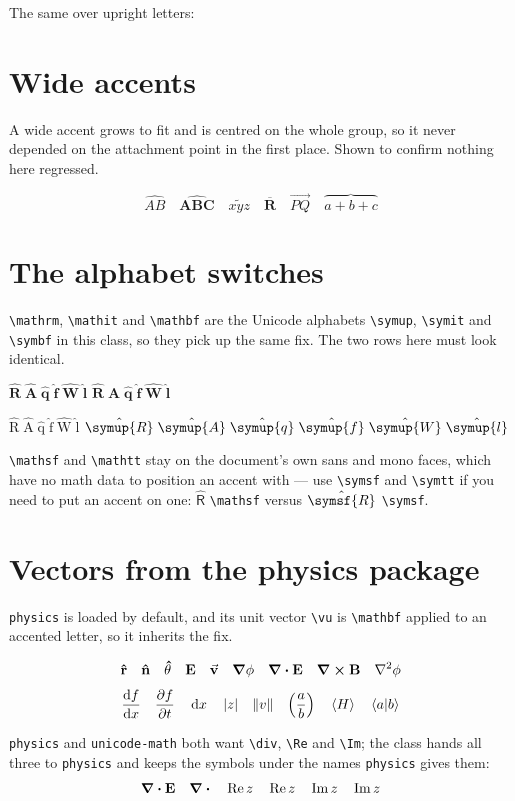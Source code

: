 \gwbaccrow{\symbf}

\medskip
\noindent
The same over upright letters:

\gwbaccrow{\symup}

\section{Wide accents}
\label{sec:wide}

A wide accent grows to fit and is centred on the whole group, so it never
depended on the attachment point in the first place. Shown to confirm nothing
here regressed.

\[
  \widehat{AB}\quad \widehat{\symbf{ABC}}\quad \widetilde{xyz}\quad
  \overline{\symbf{R}}\quad \overrightarrow{PQ}\quad
  \overbrace{a+b+c}
\]

\section{The alphabet switches}
\label{sec:alphabets}

\verb|\mathrm|, \verb|\mathit| and \verb|\mathbf| are the Unicode alphabets
\verb|\symup|, \verb|\symit| and \verb|\symbf| in this class, so they pick up
the same fix. The two rows here must look identical.

\medskip
\noindent
{}%
$\hat{\mathbf{R}}\;\hat{\mathbf{A}}\;\hat{\mathbf{q}}\;\hat{\mathbf{f}}\;
 \hat{\mathbf{W}}\;\hat{\mathbf{l}}$\qquad
{}%
$\hat{\symbf{R}}\;\hat{\symbf{A}}\;\hat{\symbf{q}}\;\hat{\symbf{f}}\;
 \hat{\symbf{W}}\;\hat{\symbf{l}}$

\medskip
\noindent
{}%
$\hat{\mathrm{R}}\;\hat{\mathrm{A}}\;\hat{\mathrm{q}}\;\hat{\mathrm{f}}\;
 \hat{\mathrm{W}}\;\hat{\mathrm{l}}$\qquad
{}%
$\hat{\symup{R}}\;\hat{\symup{A}}\;\hat{\symup{q}}\;\hat{\symup{f}}\;
 \hat{\symup{W}}\;\hat{\symup{l}}$

\medskip
\noindent
\verb|\mathsf| and \verb|\mathtt| stay on the document's own sans and mono
faces, which have no math data to position an accent with --- use
\verb|\symsf| and \verb|\symtt| if you need to put an accent on one:
$\hat{\mathsf{R}}$ \verb|\mathsf| versus $\hat{\symsf{R}}$ \verb|\symsf|.

\section{Vectors from the physics package}
\label{sec:physics}

\verb|physics| is loaded by default, and its unit vector \verb|\vu| is
\verb|\mathbf| applied to an accented letter, so it inherits the fix.

\[
  \vu{r}\quad \vu{n}\quad \vu{\theta}\quad \vb{E}\quad \va{v}\quad
  \grad\phi \quad \div\vb{E} \quad \curl\vb{B} \quad \laplacian\phi
\]
\[
  \dv{f}{x}\quad \pdv{f}{t}\quad \dd{x}\quad \abs{z}\quad \norm{v}\quad
  \qty(\frac{a}{b})\quad \ev{H}\quad \braket{a}{b}
\]

\noindent
\verb|physics| and \verb|unicode-math| both want \verb|\div|, \verb|\Re| and
\verb|\Im|; the class hands all three to \verb|physics| and keeps the symbols
under the names \verb|physics| gives them:
\[
  \div\vb{E} \quad \divisionsymbol \quad \Re z \quad \real z \quad
  \Im z \quad \imaginary z
\]
